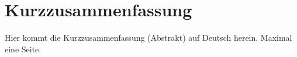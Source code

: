 \chapter*{Kurzzusammenfassung}
\label{sec:Kurzzusammenfassung}

Hier kommt die Kurzzusammenfassung (Abstrakt) auf Deutsch herein. Maximal eine Seite.\\
\\
